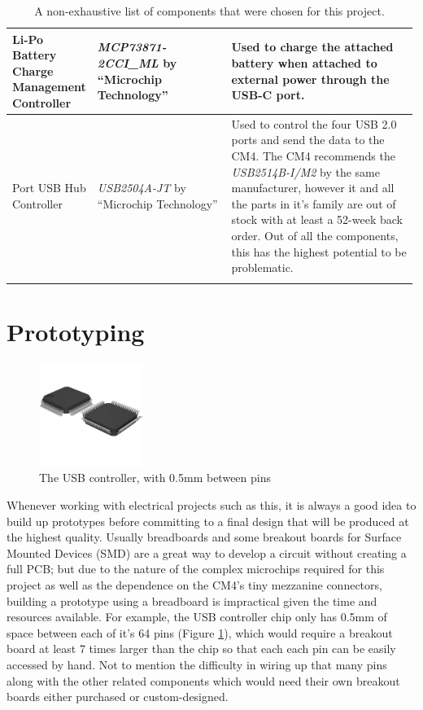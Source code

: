 \begin{longtable}{|>{\raggedright\arraybackslash}p{0.2\linewidth}|>{\raggedright\arraybackslash}p{0.33\linewidth}|>{\raggedright\arraybackslash}p{0.46\linewidth}|}
  \hline
  Li-Po Battery Charge Management Controller & \emph{MCP73871-2CCI\_ML} by \enquote{Microchip Technology} & Used to charge the attached battery when attached to external power through the USB-C port. \\
  \hline
  4 Port USB Hub Controller & \emph{USB2504A-JT} by \enquote{Microchip Technology} & Used to control the four USB 2.0 ports and send the data to the CM4. The CM4 recommends the \emph{USB2514B-I/M2} by the same manufacturer, however it and all the parts in it's family are out of stock with at least a 52-week back order. Out of all the components, this has the highest potential to be problematic.\\
  \hline
  \caption[Selected PCB Components]{A non-exhaustive list of components that were chosen for this project.}
  \label{tab:SelectedComponents}
\end{longtable}

\section{Prototyping}\label{sec:Prototyping}

\begin{figure}
  \centering
  \includegraphics[width=0.3\textwidth]{Figures/64-LQFP}
  \caption[USB Controller]{The USB controller, with 0.5mm between pins}
  \label{fig:USBController}
\end{figure}
Whenever working with electrical projects such as this, it is always a good idea to build up prototypes before committing to a final design that will be produced at the highest quality.
Usually breadboards and some breakout boards for Surface Mounted Devices (SMD) are a great way to develop a circuit without creating a full PCB; but due to the nature of the complex microchips required for this project as well as the dependence on the CM4's tiny mezzanine connectors, building a prototype using a breadboard is impractical given the time and resources available.
For example, the USB controller chip only has 0.5mm of space between each of it's 64 pins (Figure \ref{fig:USBController}), which would require a breakout board at least 7 times larger than the chip so that each each pin can be easily accessed by hand.
Not to mention the difficulty in wiring up that many pins along with the other related components which would need their own breakout boards either purchased or custom-designed.

